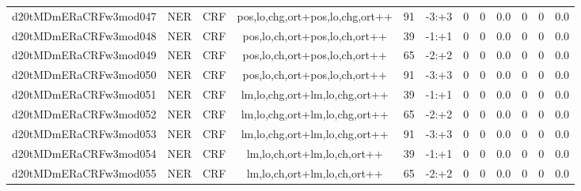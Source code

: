\documentclass[a4paper]{article}
\begin{document}
\begin{landscape}
\begin{center}
\begin{tabular}{ |c|c|c|c|c|c|c|c|c|c|c|c|}
 
 	
 	\small{ d20tMDmERaCRFw3mod047 } & \small{ NER} & \small{  CRF }  & pos,lo,chg,ort+pos,lo,chg,ort++  &  91 &  \small{  -3:+3 }  &  0 & 0 & 0.0  &  0 & 0 & 0.0 \\
 	

 
 	
 	\small{ d20tMDmERaCRFw3mod048 } & \small{ NER} & \small{  CRF }  & pos,lo,ch,ort+pos,lo,ch,ort++  &  39 &  \small{  -1:+1 }  &  0 & 0 & 0.0  &  0 & 0 & 0.0 \\
 	

 
 	
 	\small{ d20tMDmERaCRFw3mod049 } & \small{ NER} & \small{  CRF }  & pos,lo,ch,ort+pos,lo,ch,ort++  &  65 &  \small{  -2:+2 }  &  0 & 0 & 0.0  &  0 & 0 & 0.0 \\
 	

 
 	
 	\small{ d20tMDmERaCRFw3mod050 } & \small{ NER} & \small{  CRF }  & pos,lo,ch,ort+pos,lo,ch,ort++  &  91 &  \small{  -3:+3 }  &  0 & 0 & 0.0  &  0 & 0 & 0.0 \\
 	

 
 	
 	\small{ d20tMDmERaCRFw3mod051 } & \small{ NER} & \small{  CRF }  & lm,lo,chg,ort+lm,lo,chg,ort++  &  39 &  \small{  -1:+1 }  &  0 & 0 & 0.0  &  0 & 0 & 0.0 \\
 	

 
 	
 	\small{ d20tMDmERaCRFw3mod052 } & \small{ NER} & \small{  CRF }  & lm,lo,chg,ort+lm,lo,chg,ort++  &  65 &  \small{  -2:+2 }  &  0 & 0 & 0.0  &  0 & 0 & 0.0 \\
 	

 
 	
 	\small{ d20tMDmERaCRFw3mod053 } & \small{ NER} & \small{  CRF }  & lm,lo,chg,ort+lm,lo,chg,ort++  &  91 &  \small{  -3:+3 }  &  0 & 0 & 0.0  &  0 & 0 & 0.0 \\
 	

 
 	
 	\small{ d20tMDmERaCRFw3mod054 } & \small{ NER} & \small{  CRF }  & lm,lo,ch,ort+lm,lo,ch,ort++  &  39 &  \small{  -1:+1 }  &  0 & 0 & 0.0  &  0 & 0 & 0.0 \\
 	

 
 	
 	\small{ d20tMDmERaCRFw3mod055 } & \small{ NER} & \small{  CRF }  & lm,lo,ch,ort+lm,lo,ch,ort++  &  65 &  \small{  -2:+2 }  &  0 & 0 & 0.0  &  0 & 0 & 0.0 \\
 	


\end{tabular}
\end{center}
\end{landscape}
\end{document}
